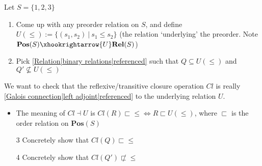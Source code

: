 

Let $S=\{1,2,3\}$
    \begin{enumerate}
      \item Come up with any preorder relation on $S$, and define $U(\leq):=\{(s_1,s_2)\ |\ s_1 \leq s_2\}$ (the relation `underlying' the preorder. Note $\mathbf{Pos}(S) \xhookrightarrow{U} \mathbf{Rel}(S)$)
      \item Pick \ref{Relation|binary relations|referenced} such that $Q \subseteq U(\leq)$ and $Q' \not \subseteq U(\leq)$
    \end{enumerate}
    We want to check that the reflexive/transitive closure operation $Cl$ is really \ref{Galois connection|left adjoint|referenced} to the underlying relation $U$.
    \begin{itemize}
      \item The meaning of $Cl \dashv U$ is $Cl(R) \sqsubset \leq \iff R \sqsubset U(\leq)$, where $\sqsubset$ is the order relation on $\mathbf{Pos}(S)$
    \end{itemize}

    \begin{enumerate}
      \item[3] Concretely show that $Cl(Q) \sqsubset \leq$
      \item[4] Concretely show that $Cl(Q') \not \sqsubset \leq$
    \end{enumerate}